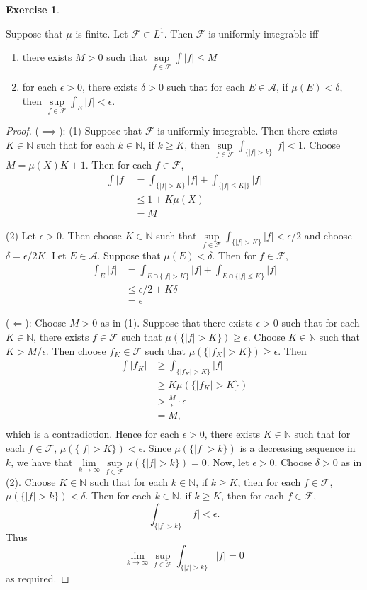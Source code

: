 \documentclass{book}
\theoremstyle{definition}
\newtheorem{ex}[definition]{Exercise}
\newcommand{\del}{\delta}
\newcommand{\ep}{\epsilon}
\newcommand{\N}{\mathbb{N}}
\newcommand{\MA}{\mathcal{A}}
\newcommand{\MF}{\mathcal{F}}
\newcommand{\lex}[1]{\label{ex:#1}}
\DeclareMathOperator*{\0}{\mbf{0}}
\DeclareMathOperator*{\1}{\mbf{1}}
\begin{document}
	\begin{ex} \lex{00000} 
		
		Suppose that $\mu$ is finite. Let $\MF \subset L^1$. Then $\MF$ is uniformly integrable iff 
		\begin{enumerate}
			\item there exists $M >0$ such that $\sup\limits_{f \in \MF}\int |f| \leq M$
			\item for each $\ep >0$, there exists $\del >0$ such that for each $E \in \MA$, if $\mu(E) < \del$, then $\sup\limits_{f \in \MF} \int_E |f| < \ep$.
		\end{enumerate}
	\end{ex}
	
	\begin{proof}
		($\implies$): (1) Suppose that $\MF$ is uniformly integrable. Then there exists $K \in \N$ such that for each $k \in \N$, if $k \geq K$, then $\sup\limits_{f \in \MF} \int_{\{|f|>k\}} |f| < 1$. Choose $M = \mu(X)K + 1$. Then for each $f \in \MF$, 
		\begin{align*}
			\int |f| 
			&= \int_{\{|f|>K\}} |f| + \int_{\{|f| \leq K|\}}|f|\\
			& \leq 1 + K\mu(X)\\
			&=M
		\end{align*}
		
		(2) Let $\ep >0$. Then choose $K \in \N$ such that $\sup\limits_{f \in \MF}\int_{\{|f|>K\}} |f| < \ep/2$ and choose $\del = \ep/2K$. Let $E \in \MA$. Suppose that $\mu(E) < \del$. Then for $f \in \MF$, 
		\begin{align*}
			\int_E |f| 
			&= \int_{E \cap \{|f| > K\}} |f| + \int_{E \cap \{|f| \leq K\}} |f|\\
			& \leq \ep/2 + K\del \\
			&=  \ep
		\end{align*}
		
		($\Leftarrow$): Choose $M >0$ as in (1). Suppose that there exists $\ep >0$ such that for each $K \in \N$, there exists $f \in \MF$ such that $\mu(\{|f| > K\}) \geq \ep$. Choose $K \in \N$ such that $K > M/\ep$. Then choose $f_K \in \MF$ such that $\mu(\{|f_K| > K\}) \geq \ep$. Then 
		\begin{align*}
			\int |f_K| 
			&\geq \int_{\{|f_K| > K\}} |f|\\
			& \geq K\mu(\{|f_K| > K\})\\
			& > \frac{M}{\ep} \cdot \ep\\
			&= M, \\
		\end{align*}  
		which is a contradiction. Hence for each $\ep >0$, there exists $K \in \N$ such that for each $f \in \MF$, $\mu(\{|f| > K\}) < \ep$. Since $\mu(\{|f| > k\})$ is a decreasing sequence in $k$, we have that $\lim\limits_{k \rightarrow \infty} \sup\limits_{f \in \MF} \mu(\{|f| > k\}) = 0$. Now, let $\ep > 0$. Choose $\del >0$ as in (2). Choose $K \in \N$ such that for each $k \in \N$, if $k \geq K$, then for each $f \in \MF$, $\mu(\{|f| > k\}) < \del$. Then for each $k \in \N$, if $k \geq K$, then for each $f \in \MF$, 
		$$\int_{\{|f| > k\}} |f| < \ep.$$ Thus $$\lim\limits_{k \rightarrow \infty} \sup\limits_{f \in \MF} \int_{\{|f|>k\}} |f| = 0$$ as required.
		

\end{proof}
\end{document}
